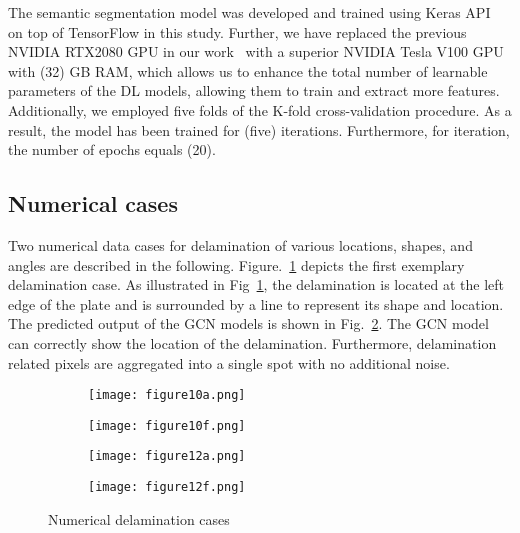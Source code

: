 \documentclass[runningheads]{llncs}
\begin{document}
The semantic segmentation model was developed and trained using Keras API~\cite{chollet2015keras} on top of TensorFlow in this study.
Further, we have replaced the previous NVIDIA RTX2080 GPU in our work~\cite{Ijjeh2021} with a superior NVIDIA Tesla V100 GPU with (32) GB RAM, which allows us to enhance the total number of learnable parameters of the DL models, allowing them to train and extract more features.
Additionally, we employed five folds of the K-fold cross-validation procedure.
As a result, the model has been trained for (five) iterations.
Furthermore, for iteration, the number of epochs equals (20).
\subsection{Numerical cases}
Two numerical data cases for delamination of various locations, shapes, and angles are described in the following.
Figure.~\ref{fig:RMS_flat_shell_Vz_448} depicts the first exemplary delamination case.
As illustrated in Fig~\ref{fig:RMS_flat_shell_Vz_448}, the delamination is located at the left edge of the plate and is surrounded by a line to represent its shape and location.
The predicted output of the GCN models is shown in Fig.~\ref{fig:gcn_pred_448}. 
The GCN model can correctly show the location of the delamination.
Furthermore, delamination related pixels are aggregated into a single spot with no additional noise.
\begin{figure}[!ht]
	\centering
	\begin{subfigure}[b]{0.47\textwidth}
		\centering
		\texttt{[image: figure10a.png]}
		\caption{}
		\label{fig:RMS_flat_shell_Vz_448}
	\end{subfigure}
	\begin{subfigure}[b]{0.47\textwidth}
		\centering
		\texttt{[image: figure10f.png]}
		\caption{}
		\label{fig:gcn_pred_448}
	\end{subfigure}
	\begin{subfigure}[b]{0.47\textwidth}
		\centering
		\texttt{[image: figure12a.png]}
		\caption{}
		\label{fig:RMS_flat_shell_Vz_475}
	\end{subfigure}
	\begin{subfigure}[b]{0.47\textwidth}
		\centering
		\texttt{[image: figure12f.png]}
		\caption{}
		\label{fig:gcn_pred_475}
	\end{subfigure}
	\caption{Numerical delamination cases}
	\label{fig:385_softmax}
\end{figure} 
\end{document}

